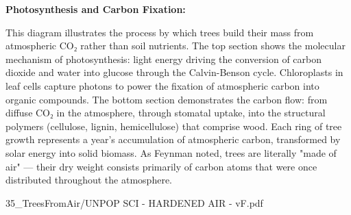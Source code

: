 \begin{SideNotePage}{
  \textbf{Photosynthesis and Carbon Fixation:} \par
  This diagram illustrates the process by which trees build their mass from atmospheric CO₂ rather than soil nutrients. The top section shows the molecular mechanism of photosynthesis: light energy driving the conversion of carbon dioxide and water into glucose through the Calvin-Benson cycle. Chloroplasts in leaf cells capture photons to power the fixation of atmospheric carbon into organic compounds. The bottom section demonstrates the carbon flow: from diffuse CO₂ in the atmosphere, through stomatal uptake, into the structural polymers (cellulose, lignin, hemicellulose) that comprise wood. Each ring of tree growth represents a year's accumulation of atmospheric carbon, transformed by solar energy into solid biomass. As Feynman noted, trees are literally "made of air" — their dry weight consists primarily of carbon atoms that were once distributed throughout the atmosphere.
}{35_TreesFromAir/UNPOP SCI - HARDENED AIR - vF.pdf}
\end{SideNotePage}

